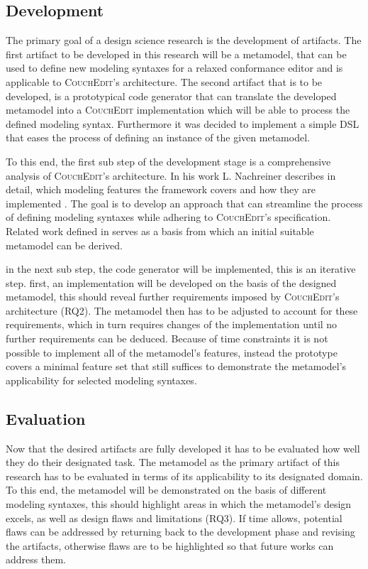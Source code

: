 \subsection{Development}
The primary goal of a design science research is the development of artifacts.
The first artifact to be developed in this research will be a metamodel, that can be used to define new modeling syntaxes for a relaxed conformance editor and is applicable to \textsc{CouchEdit}'s architecture. The second artifact that is to be developed, is a prototypical code generator that can translate the developed metamodel into a \textsc{CouchEdit} implementation which will be able to process the defined modeling syntax. Furthermore it was decided to implement a simple DSL that eases the process of defining an instance of the given metamodel.

To this end, the first sub step of the development stage is a comprehensive analysis of \textsc{CouchEdit}'s architecture. In his work L. Nachreiner describes in detail, which modeling features the framework covers and how they are implemented \cite{nachreiner_couchedit_2020}. The goal is to develop an approach that can streamline the process of defining modeling syntaxes while adhering to \textsc{CouchEdit}'s specification. Related work defined in  serves as a basis from which an initial suitable metamodel can be derived.

in the next sub step, the code generator will be implemented, this is an iterative step. first, an implementation will be developed on the basis of the designed metamodel, this should reveal further requirements imposed by \textsc{CouchEdit}'s architecture (RQ2). The metamodel then has to be adjusted to account for these requirements, which in turn requires changes of the implementation until no further requirements can be deduced. Because of time constraints it is not possible to implement all of the metamodel's features, instead the prototype covers a minimal feature set that still suffices to demonstrate the metamodel's applicability for selected modeling syntaxes.

\subsection{Evaluation}
Now that the desired artifacts are fully developed it has to be evaluated how well they do their designated task. The metamodel as the primary artifact of this research has to be evaluated in terms of its applicability to its designated domain. To this end, the metamodel will be demonstrated on the basis of different modeling syntaxes, this should highlight areas in which the metamodel's design excels, as well as design flaws and limitations (RQ3). If time allows, potential flaws can be addressed by returning back to the development phase and revising the artifacts, otherwise flaws are to be highlighted so that future works can address them.

